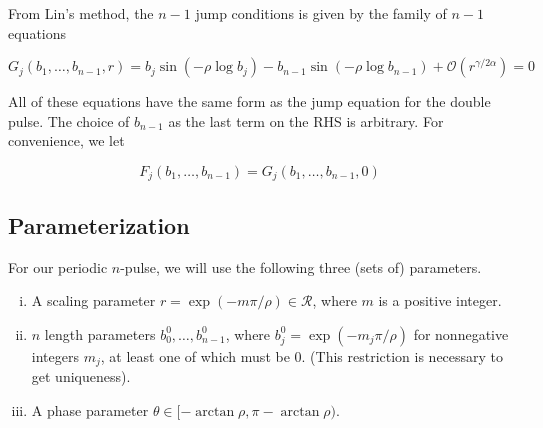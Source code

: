 \documentclass[12pt]{article}
\begin{document}
From Lin's method, the $n-1$ jump conditions is given by the family of $n-1$ equations

\begin{equation}\label{tildeGeq}
G_j(b_1, \dots, b_{n-1}, r) = b_j \sin \left( -\rho \log b_j \right) - b_{n-1} \sin \left( -\rho \log b_{n-1} \right) + \mathcal{O}(r^{\gamma / 2 \alpha}) = 0
\end{equation}

All of these equations have the same form as the jump equation for the double pulse. The choice of $b_{n-1}$ as the last term on the RHS is arbitrary. For convenience, we let 

\[
F_j(b_1, \dots, b_{n-1}) = G_j(b_1, \dots, b_{n-1}, 0)
\]

\subsection{Parameterization}

For our periodic $n$-pulse, we will use the following three (sets of) parameters.

\begin{enumerate}[(i)]
\item A scaling parameter $r = \exp(-m \pi / \rho ) \in \mathcal{R}$, where $m$ is a positive integer.
\item $n$ length parameters $b_0^0, \dots, b_{n-1}^0$, where $b_j^0 = \exp(-m_j \pi / \rho )$ for nonnegative integers $m_j$, at least one of which must be 0. (This restriction is necessary to get uniqueness).
\item A phase parameter $\theta \in [-\arctan \rho, \pi - \arctan \rho)$.
\end{enumerate}
\end{document}
